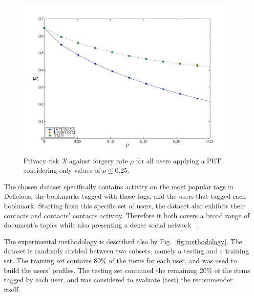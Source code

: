 \begin{figure}[htb]  
\includegraphics[width=\textwidth]{figures/Fig6a.pdf}
\caption[Privacy risk against forgery rate.]{Privacy risk $\mathcal{R}$ against forgery rate $\rho$ for all users applying a PET considering only values of $\rho\leqslant 0.25$.}
\label{fig:Risk-Rho-Small}
\end{figure}

The chosen dataset specifically contains activity on the most popular tags in Delicious, the bookmarks tagged with those tags, and the users that tagged each bookmark. Starting from this specific set of users, the dataset also exhibits their contacts and contacts' contacts activity. Therefore it both covers a broad range of document's topics while also presenting a dense social network ~\cite{a22}.

The experimental methodology is described also by Fig.~\ref{fig:methodology}. The dataset is randomly divided between two subsets, namely a testing and a training set. The training set contains 80\% of the items for each user, and was used to build the users' profiles. The testing set contained the remaining 20\% of the items tagged by each user, and was considered to evaluate (test) the recommender itself.

